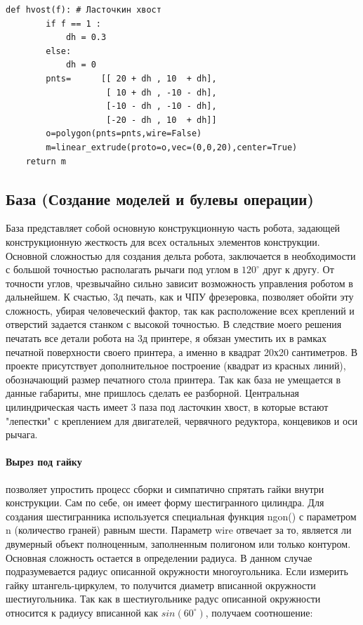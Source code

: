 \begin{lstlisting}[style=python,caption=Создание полигона из массива точек]
    def hvost(f): # Ласточкин хвост
        if f == 1 :
            dh = 0.3
        else:
            dh = 0
        pnts=      [[ 20 + dh , 10  + dh],
                    [ 10 + dh , -10 - dh],
                    [-10 - dh , -10 - dh],
                    [-20 - dh , 10  + dh]]
        o=polygon(pnts=pnts,wire=False)
        m=linear_extrude(proto=o,vec=(0,0,20),center=True)
    return m
\end{lstlisting}
\subsection{База (Создание моделей и булевы операции)}

База представляет собой основную конструкционную часть робота, задающей конструкционную жесткость для всех остальных элементов конструкции. Основной сложностью для  создания дельта робота, заключается в необходимости с большой точностью располагать рычаги под углом в $120^{\circ}$ друг к другу. От точности углов, чрезвычайно сильно зависит возможность управления роботом в дальнейшем. К счастью, 3д печать, как и ЧПУ фрезеровка, позволяет обойти эту сложность, убирая человеческий фактор, так как расположение всех креплений и отверстий задается станком с высокой точностью. В следствие моего решения печатать все детали робота на 3д принтере, я обязан уместить их в рамках печатной поверхности своего принтера, а именно в квадрат 20х20 сантиметров. В проекте присутствует дополнительное построение (квадрат из красных линий), обозначающий размер печатного стола принтера. Так как база не умещается в данные габариты, мне пришлось сделать ее разборной. Центральная цилиндрическая часть имеет 3 паза под ласточкин хвост, в которые встают "лепестки" с креплением для двигателей, червячного редуктора, концевиков и оси рычага.

\paragraph{Вырез под гайку} позволяет упростить процесс сборки и симпатично спрятать гайки внутри конструкции. Сам по себе, он имеет форму шестигранного цилиндра. Для создания шестигранника используется специальная функция ngon() с параметром n (количество граней) равным шести. Параметр wire отвечает за то, является ли двумерный объект полноценным, заполненным полигоном или только контуром. Основная сложность остается в определении радиуса. В данном случае подразумевается радиус описанной окружности многоугольника. Если измерить гайку штангель-циркулем, то получится диаметр вписанной окружности шестиугольника. Так как в шестиугольнике радус описанной окружности относится к радиусу вписанной как $sin(60^{\circ})$, получаем соотношение:

